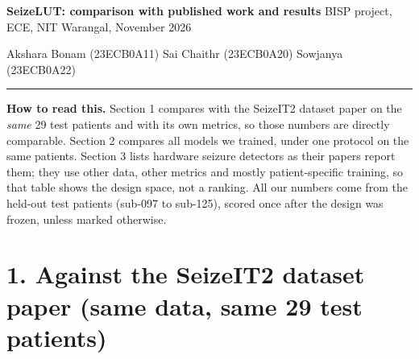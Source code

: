 \documentclass[10pt,a4paper,landscape]{article}
\begin{document}
{\LARGE\bfseries SeizeLUT: comparison with published work and results}\hfill
{\small BISP project, ECE, NIT Warangal, November 2026}\par
{\small Akshara Bonam (23ECB0A11) \quad Sai Chaithr (23ECB0A20) \quad Sowjanya (23ECB0A22)}\par
\vspace{2pt}\hrule\vspace{4pt}

\textbf{How to read this.} Section 1 compares with the SeizeIT2 dataset paper on the \emph{same} 29 test patients
and with its own metrics, so those numbers are directly comparable. Section 2 compares all models we trained, under one
protocol on the same patients. Section 3 lists hardware seizure detectors as their papers report them; they use other
data, other metrics and mostly patient-specific training, so that table shows the design space, not a ranking. All our
numbers come from the held-out test patients (sub-097 to sub-125), scored once after the design was frozen, unless
marked otherwise.

\section*{1. Against the SeizeIT2 dataset paper (same data, same 29 test patients)}
\end{document}
